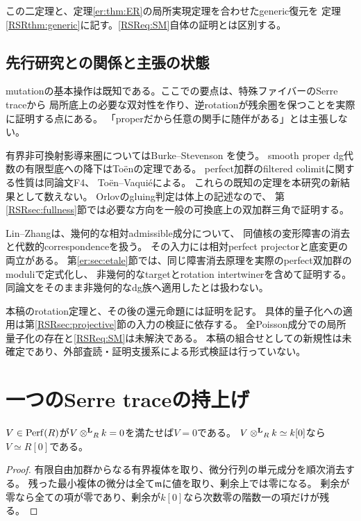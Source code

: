 この二定理と、定理\ref{er:thm:ER}の局所実現定理を合わせたgeneric復元を
定理\ref{RSRthm:generic}に記す。\eqref{RSReq:SM}自体の証明とは区別する。

\subsection{先行研究との関係と主張の状態}
mutationの基本操作は既知である。ここでの要点は、特殊ファイバーのSerre traceから
局所底上の必要な双対性を作り、逆rotationが残余圏を保つことを実際に証明する点にある。
「properだから任意の関手に随伴がある」とは主張しない。

有界非可換射影導来圏についてはBurke--Stevenson
\cite[Proposition 4.18, Lemmas 6.1--6.2, Theorem 6.4]{RSRBS}を使う。
smooth proper dg代数の有限型底への降下はToën\cite[Théorème 1]{RSRToen}の定理である。
perfect加群のfiltered colimitに関する性質は同論文F4、
Toën--Vaquié\cite[Lemma 2.10]{RSRTV}による。
これらの既知の定理を本研究の新結果として数えない。
Orlov\cite[Theorem 3.25]{RSROrlov}のgluing判定は体上の記述なので、
第\ref{RSRsec:fullness}節では必要な方向を一般の可換底上の双加群三角で証明する。

Lin--Zhang\cite[\S2.1, Theorem 2.2, Proposition 2.4]{ERLinZhang}は、幾何的な相対admissible成分について、
同値核の変形障害の消去と代数的correspondenceを扱う。
その入力には相対perfect projectorと底変更の両立がある。
第\ref{er:sec:etale}節では、同じ障害消去原理を実際のperfect双加群のmoduliで定式化し、
非幾何的なtargetとrotation intertwinerを含めて証明する。
同論文をそのまま非幾何的なdg族へ適用したとは扱わない。

本稿のrotation定理と、その後の還元命題には証明を記す。
具体的量子化への適用は第\ref{RSRsec:projective}節の入力の検証に依存する。
全Poisson成分での局所量子化の存在と\eqref{RSReq:SM}は未解決である。
本稿の組合せとしての新規性は未確定であり、外部査読・証明支援系による形式検証は行っていない。

\section{一つのSerre traceの持上げ}\label{RSRsec:trace}
\begin{lemma}[perfect複体に対する局所Nakayama]\label{RSRlem:nakayama}
$V\in\operatorname{Perf}(R)$が$V\mathbin{\otimes^{\mathbf L}}_Rk=0$を満たせば$V=0$である。
$V\mathbin{\otimes^{\mathbf L}}_Rk\simeq k[0]$なら$V\simeq R[0]$である。
\end{lemma}
\begin{proof}
有限自由加群からなる有界複体を取り、微分行列の単元成分を順次消去する。
残った最小複体の微分は全て$\mathfrak m$に値を取り、剰余上では零になる。
剰余が零なら全ての項が零であり、剰余が$k[0]$なら次数零の階数一の項だけが残る。
\end{proof}

